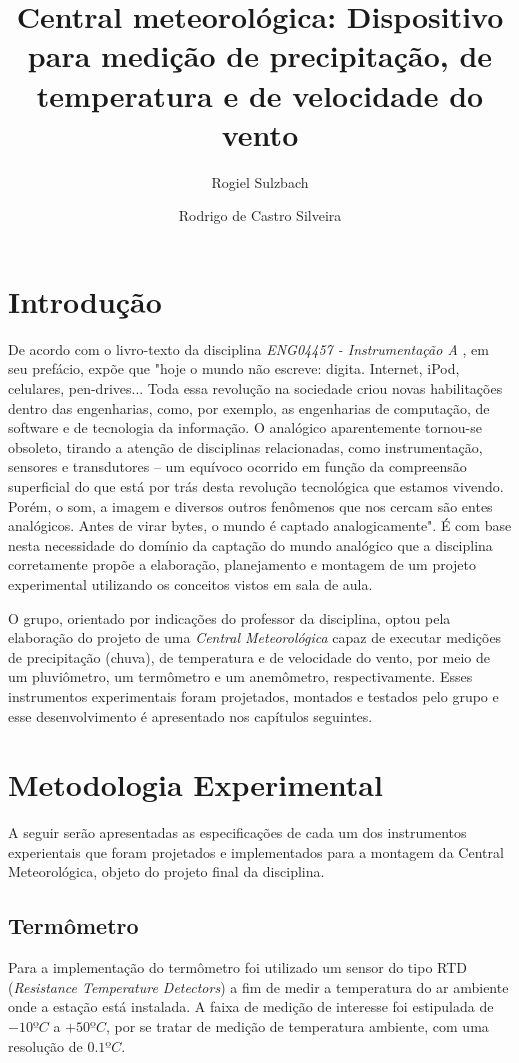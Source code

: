 \documentclass[a4paper]{instrumentacao}
\title{Central meteorológica: Dispositivo para medição de precipitação, de temperatura e de velocidade do vento}
\author{Rogiel Sulzbach \and Rodrigo de Castro Silveira}
\institute{Universidade Federal do Rio Grande do Sul, Departamento de Engenharia Elétrica, Curso de Engenharia Elétrica, Instrumentação A, Prof. Dr. Alexandre Balbinot}
\begin{document}
\fontsize{12pt}{16pt}\selectfont
\maketitle

\chapter{Introdução}
De acordo com o livro-texto da disciplina \textit{ENG04457 - Instrumentação A} \cite{livro-texto}, em seu prefácio, expõe que "hoje o mundo não escreve: digita. Internet, iPod, celulares, pen-drives... Toda essa revolução na sociedade criou novas habilitações dentro das engenharias, como, por exemplo, as engenharias de computação, de software e de tecnologia da informação. O analógico aparentemente tornou-se obsoleto, tirando a atenção de disciplinas relacionadas, como instrumentação, sensores e transdutores -- um equívoco ocorrido em função da compreensão superficial do que está por trás desta revolução tecnológica que estamos vivendo. Porém, o som, a imagem e diversos outros fenômenos que nos cercam são entes analógicos. Antes de virar bytes, o mundo é captado analogicamente". É com base nesta necessidade do domínio da captação do mundo analógico que a disciplina corretamente propõe a elaboração, planejamento e montagem de um projeto experimental utilizando os conceitos vistos em sala de aula.

O grupo, orientado por indicações do professor da disciplina, optou pela elaboração do projeto de uma \textit{Central Meteorológica} capaz de executar medições de precipitação (chuva), de temperatura e de velocidade do vento, por meio de um pluviômetro, um termômetro e um anemômetro, respectivamente. Esses instrumentos experimentais foram projetados, montados e testados pelo grupo e esse desenvolvimento é apresentado nos capítulos seguintes.

\chapter{Metodologia Experimental}
A seguir serão apresentadas as especificações de cada um dos instrumentos experientais que foram projetados e implementados para a montagem da Central Meteorológica, objeto do projeto final da disciplina.

\section{Termômetro}
Para a implementação do termômetro foi utilizado um sensor do tipo RTD (\textit{Resistance Temperature Detectors}) a fim de medir a temperatura do ar ambiente onde a estação está instalada. A faixa de medição de interesse foi estipulada de $-10ºC$ a $+50ºC$, por se tratar de medição de temperatura ambiente, com uma resolução de $0.1ºC$.
\end{document}
